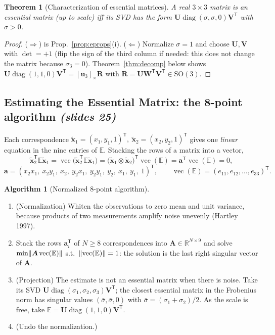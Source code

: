 \documentclass[11pt,a4paper]{article}
\newcommand{\slr}[1]{\texorpdfstring{\emph{(slides #1)}}{(slides #1)}}
\newcommand{\R}{\mathbb{R}}
\newcommand{\E}{\mathbb{E}}
\newcommand{\xt}{\tilde{\mathbf{x}}}
\newcommand{\SO}{\mathrm{SO}(3)}
\newcommand{\sk}[1]{[#1]_{\times}}
\newcommand{\tr}{^{\mathsf T}}
\DeclareMathOperator{\diag}{diag}
\DeclareMathOperator{\vecop}{vec}
\theoremstyle{definition}
\newtheorem{algorithm}{Algorithm}[section]
\theoremstyle{plain}
\newtheorem{theorem}[definition]{Theorem}
\theoremstyle{remark}
\begin{document}
\begin{theorem}[Characterization of essential matrices]\label{thm:echar}
A real $3\times3$ matrix is an essential matrix (up to scale) iff its SVD has the form $\bm U\diag(\sigma,\sigma,0)\bm V\tr$ with $\sigma>0$.
\end{theorem}
\begin{proof}
($\Rightarrow$) is Prop.~\ref{prop:eprops}(i). ($\Leftarrow$) Normalize $\sigma=1$ and choose $\bm U,\bm V$ with $\det=+1$ (flip the sign of the third column if needed: this does not change the
matrix because $\sigma_3=0$). Theorem~\ref{thm:decomp} below shows $\bm U\diag(1,1,0)\bm V\tr=\sk{\bm u_3}\bm R$ with $\bm R=\bm U\bm W\tr\bm V\tr\in\SO$.
\end{proof}

\subsection{Estimating the Essential Matrix: the 8-point algorithm \slr{25}}
Each correspondence $\xt_1=(x_1,y_1,1)\tr,\ \xt_2=(x_2,y_2,1)\tr$ gives one \emph{linear} equation in the nine entries of $\E$. Stacking the rows of a matrix into a vector,
\[
\xt_2\tr\E\xt_1=\vecop\bigl(\xt_2\tr\E\xt_1\bigr)=\bigl(\xt_1\otimes\xt_2\bigr)\tr\vecop(\E)=\bm a\tr\vecop(\E)=0,
\]
\[
\bm a=(x_2x_1,\ x_2y_1,\ x_2,\ y_2x_1,\ y_2y_1,\ y_2,\ x_1,\ y_1,\ 1)\tr,\qquad \vecop(\E)=(e_{11},e_{12},\dots,e_{33})\tr .
\]

\begin{algorithm}[Normalized 8-point algorithm]\label{alg:eightpt}
\begin{enumerate}[nosep]
\item (Normalization) Whiten the observations to zero mean and unit variance, because products of two measurements amplify noise unevenly (Hartley 1997).
\item Stack the rows $\bm a_i\tr$ of $N\ge8$ correspondences into $\bm A\in\R^{N\times9}$ and solve $\min\norm{\bm A\vecop(\E)}$ s.t.\ $\norm{\vecop(\E)}=1$:
 the solution is the last right singular vector of $\bm A$.
\item (Projection) The estimate is not an essential matrix when there is noise. Take its SVD $\bm U\diag(\sigma_1,\sigma_2,\sigma_3)\bm V\tr$; the closest essential matrix in the Frobenius norm has singular values $(\bar\sigma,\bar\sigma,0)$ with $\bar\sigma=(\sigma_1+\sigma_2)/2$.
 As the scale is free, take $\E=\bm U\diag(1,1,0)\bm V\tr$.
\item (Undo the normalization.)
\end{enumerate}
\end{algorithm}
\end{document}
